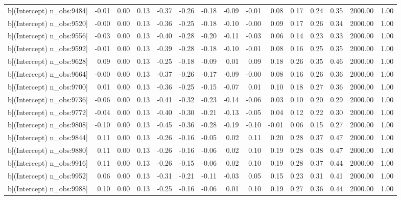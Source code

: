 \begin{table}[ht]
\begin{tabular}{rrrrrrrrrrrrrrr}
  b[(Intercept) n\_obs:9484] & -0.01 & 0.00 & 0.13 & -0.37 & -0.26 & -0.18 & -0.09 & -0.01 & 0.08 & 0.17 & 0.24 & 0.35 & 2000.00 & 1.00 \\ 
  b[(Intercept) n\_obs:9520] & -0.00 & 0.00 & 0.13 & -0.36 & -0.25 & -0.18 & -0.10 & -0.00 & 0.09 & 0.17 & 0.26 & 0.34 & 2000.00 & 1.00 \\ 
  b[(Intercept) n\_obs:9556] & -0.03 & 0.00 & 0.13 & -0.40 & -0.28 & -0.20 & -0.11 & -0.03 & 0.06 & 0.14 & 0.23 & 0.33 & 2000.00 & 1.00 \\ 
  b[(Intercept) n\_obs:9592] & -0.01 & 0.00 & 0.13 & -0.39 & -0.28 & -0.18 & -0.10 & -0.01 & 0.08 & 0.16 & 0.25 & 0.35 & 2000.00 & 1.00 \\ 
  b[(Intercept) n\_obs:9628] & 0.09 & 0.00 & 0.13 & -0.25 & -0.18 & -0.09 & 0.01 & 0.09 & 0.18 & 0.26 & 0.35 & 0.46 & 2000.00 & 1.00 \\ 
  b[(Intercept) n\_obs:9664] & -0.00 & 0.00 & 0.13 & -0.37 & -0.26 & -0.17 & -0.09 & -0.00 & 0.08 & 0.16 & 0.26 & 0.36 & 2000.00 & 1.00 \\ 
  b[(Intercept) n\_obs:9700] & 0.01 & 0.00 & 0.13 & -0.36 & -0.25 & -0.15 & -0.07 & 0.01 & 0.10 & 0.18 & 0.27 & 0.36 & 2000.00 & 1.00 \\ 
  b[(Intercept) n\_obs:9736] & -0.06 & 0.00 & 0.13 & -0.41 & -0.32 & -0.23 & -0.14 & -0.06 & 0.03 & 0.10 & 0.20 & 0.29 & 2000.00 & 1.00 \\ 
  b[(Intercept) n\_obs:9772] & -0.04 & 0.00 & 0.13 & -0.40 & -0.30 & -0.21 & -0.13 & -0.05 & 0.04 & 0.12 & 0.22 & 0.30 & 2000.00 & 1.00 \\ 
  b[(Intercept) n\_obs:9808] & -0.10 & 0.00 & 0.13 & -0.45 & -0.36 & -0.28 & -0.19 & -0.10 & -0.01 & 0.06 & 0.15 & 0.27 & 2000.00 & 1.00 \\ 
  b[(Intercept) n\_obs:9844] & 0.11 & 0.00 & 0.13 & -0.26 & -0.16 & -0.05 & 0.02 & 0.11 & 0.20 & 0.28 & 0.37 & 0.47 & 2000.00 & 1.00 \\ 
  b[(Intercept) n\_obs:9880] & 0.11 & 0.00 & 0.13 & -0.26 & -0.16 & -0.06 & 0.02 & 0.10 & 0.19 & 0.28 & 0.38 & 0.47 & 2000.00 & 1.00 \\ 
  b[(Intercept) n\_obs:9916] & 0.11 & 0.00 & 0.13 & -0.26 & -0.15 & -0.06 & 0.02 & 0.10 & 0.19 & 0.28 & 0.37 & 0.44 & 2000.00 & 1.00 \\ 
  b[(Intercept) n\_obs:9952] & 0.06 & 0.00 & 0.13 & -0.31 & -0.21 & -0.11 & -0.03 & 0.05 & 0.15 & 0.23 & 0.31 & 0.41 & 2000.00 & 1.00 \\ 
  b[(Intercept) n\_obs:9988] & 0.10 & 0.00 & 0.13 & -0.25 & -0.16 & -0.06 & 0.01 & 0.10 & 0.19 & 0.27 & 0.36 & 0.44 & 2000.00 & 1.00 \\ 

\end{tabular}
\end{table}
